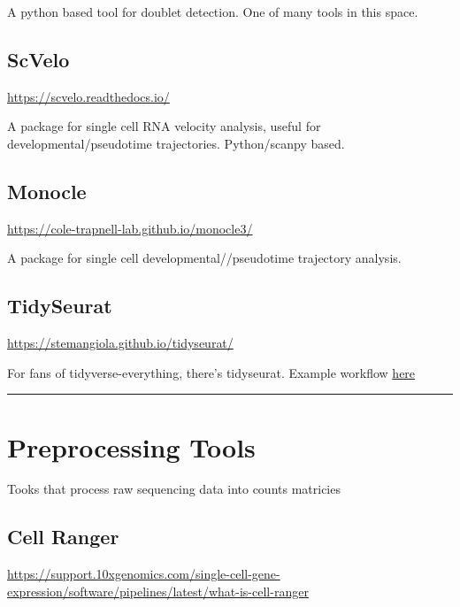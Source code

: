 \documentclass[
]{book}
\begin{document}
A python based tool for doublet detection. One of many tools in this space.

\subsection*{ScVelo}\label{scvelo}

\url{https://scvelo.readthedocs.io/}

A package for single cell RNA velocity analysis, useful for developmental/pseudotime trajectories. Python/scanpy based.

\subsection*{Monocle}\label{monocle}

\url{https://cole-trapnell-lab.github.io/monocle3/}

A package for single cell developmental//pseudotime trajectory analysis.

\subsection*{TidySeurat}\label{tidyseurat}

\url{https://stemangiola.github.io/tidyseurat/}

For fans of tidyverse-everything, there's tidyseurat. Example workflow \href{https://tidytranscriptomics-workshops.github.io/bioc2022_tidytranscriptomics/articles/tidytranscriptomics_case_study.html}{here}

\begin{center}\rule{0.5\linewidth}{0.5pt}\end{center}

\section{Preprocessing Tools}\label{preprocessing-tools}

Tooks that process raw sequencing data into counts matricies

\subsection*{Cell Ranger}\label{cell-ranger}

\url{https://support.10xgenomics.com/single-cell-gene-expression/software/pipelines/latest/what-is-cell-ranger}
\end{document}
